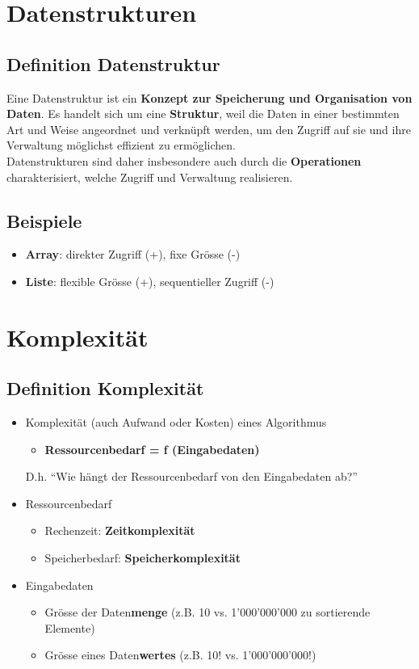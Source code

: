 \documentclass[10pt,a4paper]{article}
\begin{document}
\section{Datenstrukturen}
\subsection{Definition Datenstruktur}
Eine Datenstruktur ist ein \textbf{Konzept zur Speicherung und Organisation von Daten}. Es handelt sich um eine \textbf{Struktur}, weil die Daten in einer bestimmten Art und Weise angeordnet und verknüpft werden, um den Zugriff auf sie und ihre Verwaltung möglichst effizient zu ermöglichen.\\
Datenstrukturen sind daher insbesondere auch durch die \textbf{Operationen} charakterisiert, welche Zugriff und Verwaltung realisieren.
\subsection{Beispiele}
\begin{itemize}[noitemsep,topsep=0pt,leftmargin=*]
    \item \textbf{Array}: direkter Zugriff (+), fixe Grösse (-)
    \item \textbf{Liste}: flexible Grösse (+), sequentieller Zugriff (-)
\end{itemize}

\section{Komplexität}
\subsection{Definition Komplexität}
\begin{itemize}[noitemsep,topsep=0pt,leftmargin=*]
    \item Komplexität (auch Aufwand oder Kosten) eines Algorithmus
    \begin{itemize}[noitemsep,topsep=0pt,leftmargin=*]
        \item \textbf{Ressourcenbedarf = f (Eingabedaten)}
    \end{itemize}
    \subitem D.h. "`Wie hängt der Ressourcenbedarf von den Eingabedaten ab?"'
    \item Ressourcenbedarf
    \begin{itemize}[noitemsep,topsep=0pt,leftmargin=*]
        \item Rechenzeit: \textbf{Zeitkomplexität}
        \item Speicherbedarf: \textbf{Speicherkomplexität}
    \end{itemize}
    \item Eingabedaten
    \begin{itemize}[noitemsep,topsep=0pt,leftmargin=*]
        \item Grösse der Daten\textbf{menge} (z.B. 10 vs. 1'000'000'000 zu sortierende Elemente)
        \item Grösse eines Daten\textbf{wertes} (z.B. 10! vs. 1'000'000'000!)
    \end{itemize}
\end{itemize}
\end{document}
